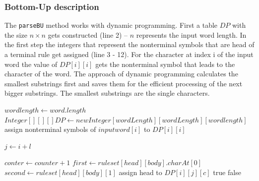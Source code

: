 \documentclass[a4paper, 11pt]{article}
\begin{document}


\subsubsection{Bottom-Up description}
\label{bottomupdescription}

The \texttt{parseBU} method works with dynamic programming.
First a table $DP$ with the size $n \times n$ gets constructed (line 2) -- $n$ represents the input word length.
In the first step the integers that represent the nonterminal symbols that are head of a terminal rule get assigned (line 3 - 12). For the character at index i of the input word the value of $DP[i][i]$ gets the nonterminal symbol that leads to the character of the word.
The approach of dynamic programming calculates the smallest substrings first and saves them for the efficient processing of the next bigger substrings.  The smallest substrings are the single characters.


\begin{center}
\label{alg:cap}
\begin{algorithmic}[1]
\State $wordlength \gets word.length$ 
\State $Integer[][][] DP \gets new Integer[wordLength][wordLength][wordlength]$
\State assign nonterminal symbols of $inputword[i]$ to $DP[i][i]$
\EndIf
\EndFor

\State $j \gets i + l$

\State $conter \gets counter + 1$
\State $first \gets ruleset[head][body].charAt[0]$
\State $second \gets ruleset[head][body][1]$
\State assign head to $DP[i][j][c]$\footnotemark
\EndIf
\EndIf
\EndFor
\EndFor
\EndFor
\EndFor
\EndFor
{}
\State \Return true
\EndIf
\State \Return false
\end{algorithmic}
\hrulefill
\end{center}
\end{document}

